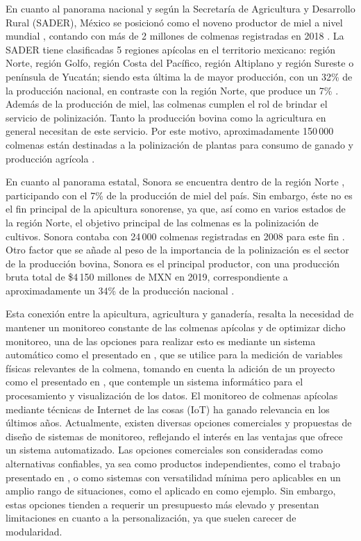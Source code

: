 En cuanto al panorama nacional y según la Secretaría de Agricultura y Desarrollo Rural (SADER), México se posicionó como el noveno productor de miel a nivel mundial \cite{SecretariaDeAgriculturaDesarrolloRural}, contando con más de 2 millones de colmenas registradas en 2018 \cite{SecretariaDeAgriculturaDesarrolloRural2022}.
La SADER tiene clasificadas 5 regiones apícolas en el territorio mexicano: región Norte, región Golfo, región Costa del Pacífico, región Altiplano y región Sureste o península de Yucatán; siendo esta última la de mayor producción, con un 32\% de la producción nacional, en contraste con la región Norte, que produce un 7\% \cite{SecretariaDeAgriculturaDesarrolloRural2022}.
Además de la producción de miel, las colmenas cumplen el rol de brindar el servicio de polinización. Tanto la producción bovina como la agricultura en general necesitan de este servicio. Por este motivo, aproximadamente 150\,000 colmenas están destinadas a la polinización de plantas para consumo de ganado y producción agrícola \cite{SecretariaDeAgriculturaDesarrolloRural2022}.

En cuanto al panorama estatal, Sonora se encuentra dentro de la región Norte \cite{coordinacion_general_de_ganaderia_2015}, participando con el 7\% de la producción de miel del país. Sin embargo, éste no es el fin principal de la apicultura sonorense, ya que, así como en varios estados de la región Norte, el objetivo principal de las colmenas es la polinización de cultivos. Sonora contaba con 24\,000 colmenas registradas en 2008 para este fin \cite{coordinacion_general_de_ganaderia_2015}.
Otro factor que se añade al peso de la importancia de la polinización es el sector de la producción bovina, Sonora es el principal productor, con una producción bruta total de \$4\,150 millones de MXN en 2019, correspondiente a aproximadamente un 34\% de la producción nacional \cite{data_mexico_2023b}.

Esta conexión entre la apicultura, agricultura y ganadería, resalta la necesidad de mantener un monitoreo constante de las colmenas apícolas y de optimizar dicho monitoreo, una de las opciones para realizar esto es mediante un sistema automático como el presentado en \cite{chen_chien_hsu_jing_lin_lin_2020}, que se utilice para la medición de variables físicas relevantes de la colmena, tomando en cuenta la adición de un proyecto como el presentado en \cite{marina_lara_meza_2023}, que contemple un sistema informático para el procesamiento y visualización de los datos.
El monitoreo de colmenas apícolas mediante técnicas de Internet de las cosas (IoT) ha ganado relevancia en los últimos años. Actualmente, existen diversas opciones comerciales y propuestas de diseño de sistemas de monitoreo, reflejando el interés en las ventajas que ofrece un sistema automatizado.
Las opciones comerciales son consideradas como alternativas confiables, ya sea como productos independientes, como el trabajo presentado en \cite{Solutionbee}, o como sistemas con versatilidad mínima pero aplicables en un amplio rango de situaciones, como el aplicado en \cite{OpenEnergyMonitor} como ejemplo.
Sin embargo, estas opciones tienden a requerir un presupuesto más elevado y presentan limitaciones en cuanto a la personalización, ya que suelen carecer de modularidad.

